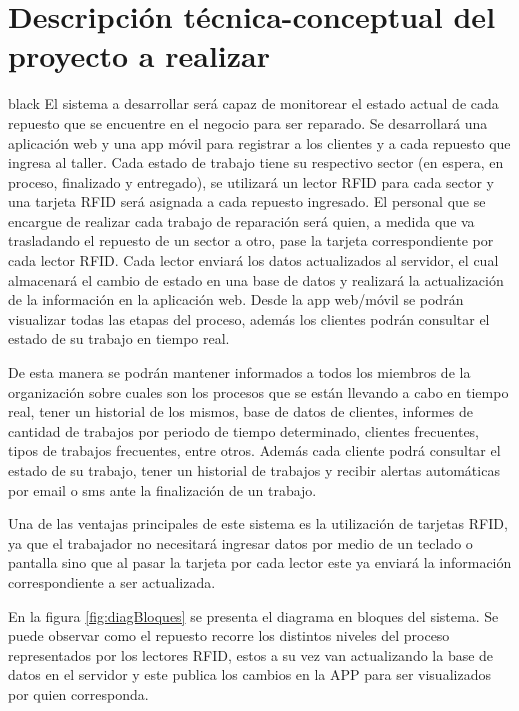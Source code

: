 \documentclass[11pt]{charter}
\begin{document}
\section{Descripción técnica-conceptual del proyecto a realizar}
\label{sec:descripcion}

\begin{consigna}{black}
El sistema a desarrollar será capaz de monitorear el estado actual de cada repuesto que se encuentre en el negocio para ser reparado.
Se desarrollará una aplicación web y una app móvil para registrar a los clientes y a cada repuesto que ingresa al taller.
Cada estado de trabajo tiene su respectivo sector (en espera, en proceso, finalizado y entregado), se utilizará un lector RFID para cada sector y una tarjeta RFID será asignada a cada repuesto ingresado.
El personal que se encargue de realizar cada trabajo de reparación será quien, a medida que va trasladando el repuesto de un sector a otro, pase la tarjeta correspondiente por cada lector RFID. 
Cada lector enviará los datos actualizados al servidor, el cual almacenará el cambio de estado en una base de datos y realizará la actualización de la información en la aplicación web.
Desde la app web/móvil se podrán visualizar todas las etapas del proceso, además los clientes podrán consultar el estado de su trabajo en tiempo real.

De esta manera se podrán mantener informados a todos los miembros de la organización sobre cuales son los procesos que se están llevando a cabo en tiempo real, tener un historial de los mismos, base de datos de clientes, informes de cantidad de trabajos por periodo de tiempo determinado, clientes frecuentes, tipos de trabajos frecuentes, entre otros.
Además cada cliente podrá consultar el estado de su trabajo, tener un historial de trabajos y recibir alertas automáticas por email o sms ante la finalización de un trabajo.

Una de las ventajas principales de este sistema es la utilización de tarjetas RFID, ya que el trabajador no necesitará ingresar datos por medio de un teclado o pantalla sino que al pasar la tarjeta por cada lector este ya enviará la información correspondiente a ser actualizada.

En la figura \ref{fig:diagBloques} se presenta el diagrama en bloques del sistema. Se puede observar como el repuesto recorre los distintos niveles del proceso representados por los lectores RFID, estos a su vez van actualizando la base de datos en el servidor y este publica los cambios en la APP para ser visualizados por quien corresponda.


\end{consigna}
\end{document}
